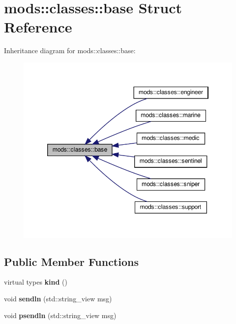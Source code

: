 \hypertarget{structmods_1_1classes_1_1base}{}\section{mods\+:\+:classes\+:\+:base Struct Reference}
\label{structmods_1_1classes_1_1base}


Inheritance diagram for mods\+:\+:classes\+:\+:base\+:\nopagebreak
\begin{figure}[H]
\begin{center}
\leavevmode
\includegraphics[width=346pt]{structmods_1_1classes_1_1base__inherit__graph}
\end{center}
\end{figure}
\subsection*{Public Member Functions}
\begin{DoxyCompactItemize}
\item 
\mbox{\label{structmods_1_1classes_1_1base_a16c5756e82a8b0733db6306cdfd0f687}} 
virtual types {\bfseries kind} ()
\item 
\mbox{\label{structmods_1_1classes_1_1base_a9e0fa6e4ba9bc3b6931976fc0787379f}} 
void {\bfseries sendln} (std\+::string\+\_\+view msg)
\item 
\mbox{\label{structmods_1_1classes_1_1base_aa759d2a62a44a4c76c1ffdcfb5f2a185}} 
void {\bfseries psendln} (std\+::string\+\_\+view msg)
\end{DoxyCompactItemize}

